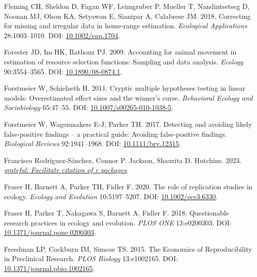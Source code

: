 \documentclass[10pt,a4paper]{article}
\newlength{\cslhangindent}
\newenvironment{CSLReferences}[2] %
 {\begin{list}{}{%
  \setlength{\itemindent}{0pt}
  \setlength{\leftmargin}{0pt}
  \setlength{\parsep}{0pt}
  \ifodd #1
   \setlength{\leftmargin}{\cslhangindent}
   \setlength{\itemindent}{-1\cslhangindent}
  \fi
  \setlength{\itemsep}{#2\baselineskip}}}
 {\end{list}}
\begin{document}
\begin{CSLReferences}{1}{0}
Fleming CH, Sheldon D, Fagan WF, Leimgruber P, Mueller T, Nandintsetseg D, Noonan MJ, Olson KA, Setyawan E, Sianipar A, Calabrese JM. 2018. Correcting for missing and irregular data in home-range estimation. \emph{Ecological Applications} 28:1003--1010. DOI: \href{https://doi.org/10.1002/eap.1704}{10.1002/eap.1704}.

Forester JD, Im HK, Rathouz PJ. 2009. Accounting for animal movement in estimation of resource selection functions: Sampling and data analysis. \emph{Ecology} 90:3554--3565. DOI: \href{https://doi.org/10.1890/08-0874.1}{10.1890/08-0874.1}.

Forstmeier W, Schielzeth H. 2011. Cryptic multiple hypotheses testing in linear models: Overestimated effect sizes and the winner's curse. \emph{Behavioral Ecology and Sociobiology} 65:47--55. DOI: \href{https://doi.org/10.1007/s00265-010-1038-5}{10.1007/s00265-010-1038-5}.

Forstmeier W, Wagenmakers E-J, Parker TH. 2017. Detecting and avoiding likely false-positive findings -- a practical guide: {Avoiding} false-positive findings. \emph{Biological Reviews} 92:1941--1968. DOI: \href{https://doi.org/10.1111/brv.12315}{10.1111/brv.12315}.

Francisco Rodríguez-Sánchez, Connor P. Jackson, Shaurita D. Hutchins. 2023. \emph{\href{https://github.com/Pakillo/grateful}{{grateful}: Facilitate citation of r packages}}.

Fraser H, Barnett A, Parker TH, Fidler F. 2020. The role of replication studies in ecology. \emph{Ecology and Evolution} 10:5197--5207. DOI: \href{https://doi.org/10.1002/ece3.6330}{10.1002/ece3.6330}.

Fraser H, Parker T, Nakagawa S, Barnett A, Fidler F. 2018. Questionable research practices in ecology and evolution. \emph{PLOS ONE} 13:e0200303. DOI: \href{https://doi.org/10.1371/journal.pone.0200303}{10.1371/journal.pone.0200303}.

Freedman LP, Cockburn IM, Simcoe TS. 2015. The {Economics} of {Reproducibility} in {Preclinical} {Research}. \emph{PLOS Biology} 13:e1002165. DOI: \href{https://doi.org/10.1371/journal.pbio.1002165}{10.1371/journal.pbio.1002165}.


\end{CSLReferences}
\end{document}
